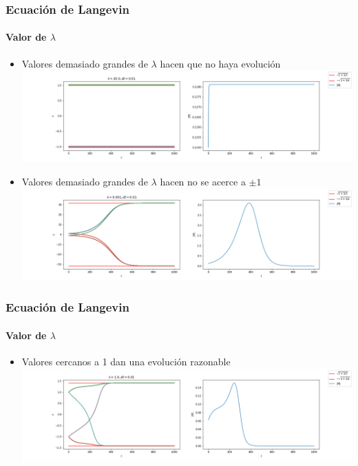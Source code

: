 \documentclass[11pt]{beamer}
\begin{document}
\begin{frame}
\frametitle{Ecuación de Langevin}
\framesubtitle{Valor de $\lambda$}
\begin{itemize}
	\item Valores demasiado grandes de $\lambda$ hacen que no haya evolución
	\includegraphics[width=\linewidth]{Sobreamortiguado.png}
	\item Valores demasiado grandes de $\lambda$ hacen no se acerce a $\pm 1$
	\includegraphics[width=\linewidth]{Subamortiguado.png}
\end{itemize}
\end{frame}

\begin{frame}
\frametitle{Ecuación de Langevin}
\framesubtitle{Valor de $\lambda$}
\begin{itemize}
	\item Valores cercanos a 1 dan una evolución razonable
	\includegraphics[width=\linewidth, trim= 0 0 0 -3cm]{Normal.png}
\end{itemize}
\end{frame}
\end{document}

